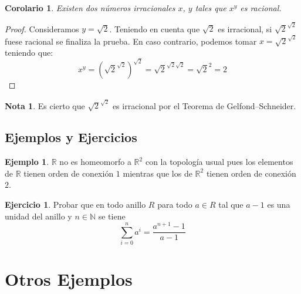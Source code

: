 \documentclass{article}
\theoremstyle{theorem-style}  %
\newtheorem{corollary}[theorem]{Corolario} %
\theoremstyle{definition}
\newtheorem*{note}{Nota} %
\theoremstyle{example-style}
\newtheorem{example}{Ejemplo}[section]
\newtheorem{exercise}{Ejercicio}[section]
\begin{document}
        \begin{corollary}
            Existen dos números irracionales $x$, $y$ tales que $x^y$ es racional.
        \end{corollary}
        \begin{proof}
            Consideramos $y = \sqrt 2$. Teniendo en cuenta que $\sqrt 2$ es irracional, si 
            ${\sqrt 2} ^ {\sqrt 2}$ fuese racional se finaliza la prueba. En caso contrario,
            podemos tomar $x = {\sqrt 2} ^ {\sqrt 2}$ teniendo que:
             $$ x ^ y = \left({\sqrt 2}^{\sqrt 2}\right) ^ {\sqrt 2} = {\sqrt 2} ^ {\sqrt 2 \sqrt 2} = {\sqrt 2} ^ 2 = 2 $$ 
        \end{proof}
        
        \begin{note}
            Es cierto que  ${\sqrt 2} ^ {\sqrt 2}$ es irracional por el Teorema de Gelfond–Schneider.
        \end{note}
    
    
    \subsection{Ejemplos y Ejercicios}
    
        \begin{example}
            $\mathbb{R}$ no es homeomorfo a $\mathbb{R}^2$ con la topología usual pues los elementos de $\mathbb{R}$ tienen orden de conexión $1$ mientras que los de $\mathbb{R}^2$ tienen orden de conexión $2$.
        \end{example}
        
        \begin{exercise}
            Probar que en todo anillo $R$ para todo $a \in R$ tal que $a-1$ es una unidad del anillo y $n \in \mathbb{N}$ se tiene
            \begin{equation}
                \sum^n_{i=0} a^i = \frac{a^{n+1}-1}{a-1}
            \end{equation}        
        \end{exercise}
    

\section{Otros Ejemplos}
\end{document}

